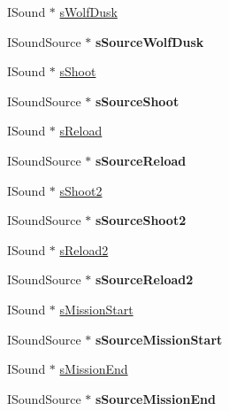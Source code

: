 \begin{DoxyCompactItemize}
\item 
ISound $\ast$ \hyperlink{class_sound_a68f6b3a4aba5ab4324f8f20f5b4a653f}{sWolfDusk}
\item 
\hypertarget{class_sound_aa720d0508e46ddb30fbe1df2470a3505}{
ISoundSource $\ast$ {\bfseries sSourceWolfDusk}}
\label{class_sound_aa720d0508e46ddb30fbe1df2470a3505}

\item 
ISound $\ast$ \hyperlink{class_sound_a8932916979c5479e73225def2abe1f42}{sShoot}
\item 
\hypertarget{class_sound_aaf04840e3d9c8baf9c81f6265f9a611b}{
ISoundSource $\ast$ {\bfseries sSourceShoot}}
\label{class_sound_aaf04840e3d9c8baf9c81f6265f9a611b}

\item 
ISound $\ast$ \hyperlink{class_sound_af7bd98fddb7793a24c3159a77df5ee08}{sReload}
\item 
\hypertarget{class_sound_aedcbf4760dc7bbdf74247c74ec0b4a69}{
ISoundSource $\ast$ {\bfseries sSourceReload}}
\label{class_sound_aedcbf4760dc7bbdf74247c74ec0b4a69}

\item 
ISound $\ast$ \hyperlink{class_sound_a5aca3233d6b0c64c18eb3d572ecb2304}{sShoot2}
\item 
\hypertarget{class_sound_a532be89f38a3830c7732867a5fbc1ec9}{
ISoundSource $\ast$ {\bfseries sSourceShoot2}}
\label{class_sound_a532be89f38a3830c7732867a5fbc1ec9}

\item 
ISound $\ast$ \hyperlink{class_sound_ae71eeccc328dd51f772f5a196179cb25}{sReload2}
\item 
\hypertarget{class_sound_a8b616c2c323c9648c9034d2382e02d84}{
ISoundSource $\ast$ {\bfseries sSourceReload2}}
\label{class_sound_a8b616c2c323c9648c9034d2382e02d84}

\item 
ISound $\ast$ \hyperlink{class_sound_a77b47c9d823199006247f6170be5fe16}{sMissionStart}
\item 
\hypertarget{class_sound_add38478ecb9f88a3cf6f5df851e3cfcb}{
ISoundSource $\ast$ {\bfseries sSourceMissionStart}}
\label{class_sound_add38478ecb9f88a3cf6f5df851e3cfcb}

\item 
ISound $\ast$ \hyperlink{class_sound_a6fc954df665a4b57821cd8aa45a1744b}{sMissionEnd}
\item 
\hypertarget{class_sound_aae44eca75505ddf88f57fce86d3ef883}{
ISoundSource $\ast$ {\bfseries sSourceMissionEnd}}
\label{class_sound_aae44eca75505ddf88f57fce86d3ef883}


\end{DoxyCompactItemize}
